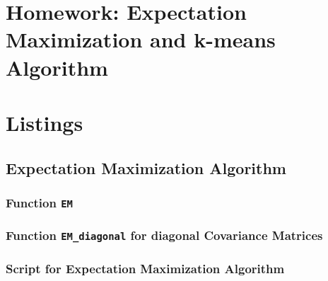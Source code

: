 
\chapter{Homework: Expectation Maximization and k-means Algorithm}


\clearpage


\clearpage

\newpage


\chapter{Listings}

\section{Expectation Maximization Algorithm}

\subsection{Function \texttt{EM}}


\subsection{Function \texttt{EM_diagonal} for diagonal Covariance Matrices}


\subsection{Script for Expectation Maximization Algorithm}




%
%

\FloatBarrier\label{end-of-document}


